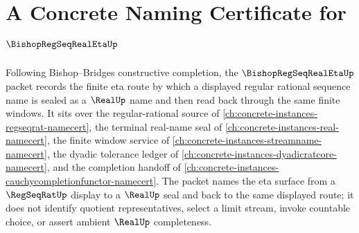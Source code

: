 \chapter{A Concrete Naming Certificate for $\BishopRegSeqRealEtaUp$}
\label{ch:concrete-instances-bishop-regseq-real-eta-namecert}

Following Bishop--Bridges constructive completion, the $\BishopRegSeqRealEtaUp$ packet records the finite eta route by which a displayed regular rational sequence name is sealed as a $\RealUp$ name and then read back through the same finite windows. It sits over the regular-rational source of \autoref{ch:concrete-instances-regseqrat-namecert}, the terminal real-name seal of \autoref{ch:concrete-instances-real-namecert}, the finite window service of \autoref{ch:concrete-instances-streamname-namecert}, the dyadic tolerance ledger of \autoref{ch:concrete-instances-dyadicratcore-namecert}, and the completion handoff of \autoref{ch:concrete-instances-cauchycompletionfunctor-namecert}. The packet names the eta surface from a $\RegSeqRatUp$ display to a $\RealUp$ seal and back to the same displayed route; it does not identify quotient representatives, select a limit stream, invoke countable choice, or assert ambient $\RealUp$ completeness.

